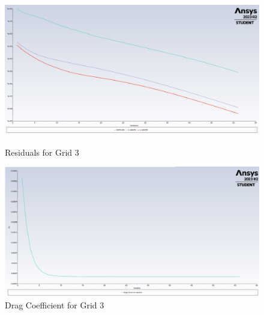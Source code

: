\begin{figure}[H]
    \centering
    \begin{minipage}{0.45\textwidth}
        \centering
        \includegraphics[width=\textwidth]{Questions/Figures/residuals grid 3.png}
        \caption{Residuals for Grid 3}
        \label{fig:residuals_grid_3}
    \end{minipage}
    \begin{minipage}{0.45\textwidth}
        \centering
        \includegraphics[width=\textwidth]{Questions/Figures/drag force on square grid 3.png}
        \caption{Drag Coefficient for Grid 3}
        \label{fig:drag_coefficient_grid_3}
    \end{minipage}
\end{figure}
